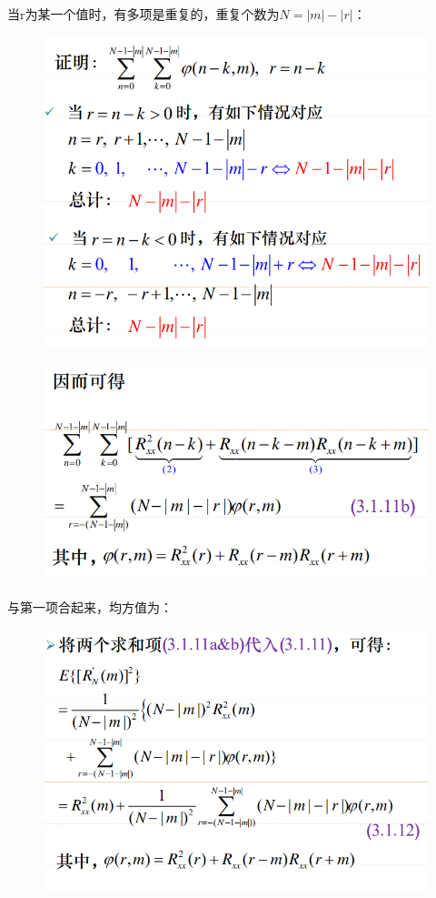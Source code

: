 \documentclass[UTF8]{ctexart} %
\begin{document}
				当r为某一个值时，有多项是重复的，重复个数为$N=|m|-|r|$：
				\begin{figure}[H]
					\centering\includegraphics[scale=0.4]{79.png}
				\end{figure}
				\begin{figure}[H]
					\centering\includegraphics[scale=0.4]{80.png}
				\end{figure}
				与第一项合起来，均方值为：
				\begin{figure}[H]
					\centering\includegraphics[scale=0.4]{81.png}
				\end{figure}
\end{document}
